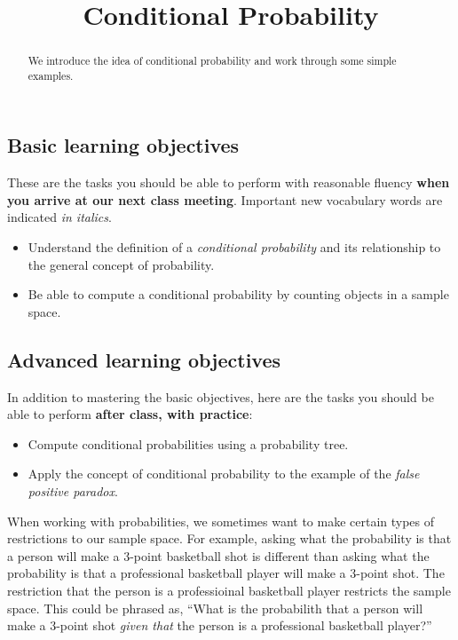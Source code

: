 \documentclass{ximera}
\title{Conditional Probability}
\begin{document}
\begin{abstract}
We introduce the idea of conditional probability and work through some simple examples.
\end{abstract}
\maketitle

\subsection*{Basic learning objectives}

These are the tasks you should be able to perform with reasonable fluency \textbf{when you arrive at our next class meeting}. Important new vocabulary words are indicated \emph{in italics}. 

\begin{itemize}
    \item Understand the definition of a \emph{conditional probability} and its relationship to the general concept of probability.
    \item Be able to compute a conditional probability by counting objects in a sample space.
\end{itemize}

\subsection*{Advanced learning objectives}

In addition to mastering the basic objectives, here are the tasks you should be able to perform \textbf{after class, with practice}: 

\begin{itemize}
    \item Compute conditional probabilities using a probability tree.
    \item Apply the concept of conditional probability to the example of the \emph{false positive paradox}.
\end{itemize}

\noindent\hrulefill

When working with probabilities, we sometimes want to make certain types of restrictions to our sample space. For example, asking what the probability is that a person will make a 3-point basketball shot is different than asking what the probability is that a professional basketball player will make a 3-point shot. The restriction that the person is a professioinal basketball player restricts the sample space. This could be phrased as, ``What is the probabilith that a person will make a 3-point shot \emph{given that} the person is a professional basketball player?''
\end{document}
